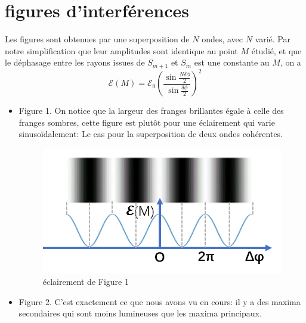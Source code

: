 \documentclass[a4paper,12pt]{book}
\begin{document}
\renewcommand{\labelitemi}{$\blacktriangleright$}
\renewcommand{\labelitemii}{$\bullet$}


\section{figures d’interférences}
Les figures sont obtenues par une superposition de $N$ ondes, avec $N$ varié.
Par notre simplification que leur amplitudes sont identique au point $M$ étudié, et que 
le déphasage entre les rayons issues de $S_{m+1}$ et $S_m$ est une constante au $M$, 
on a 
$$
\mathcal{E}(M)=\mathcal{E}_0\left(\frac{\sin \frac{N\delta \phi}{2}}{\sin \frac{\delta \phi}{2}}\right)^2
$$
\begin{itemize}
    \item Figure 1. On notice que la largeur des franges brillantes égale à celle des franges sombres, 
          cette figure est plutôt pour une éclairement qui varie sinusoïdalement: Le cas pour la superposition 
          de deux ondes cohérentes. 
          \begin{figure}[h]
            \begin{center}
            \includegraphics[scale=0.8]{tr111.png}
            \end{center}
            \vspace{-0.8cm}
            \caption{éclairement de Figure 1}
        \end{figure}
    


    \item Figure 2. C'est exactement ce que nous avons vu en cours: il y a des maxima secondaires qui sont moins lumineuses que 
          les maxima principaux. 


\end{itemize}
\end{document}
